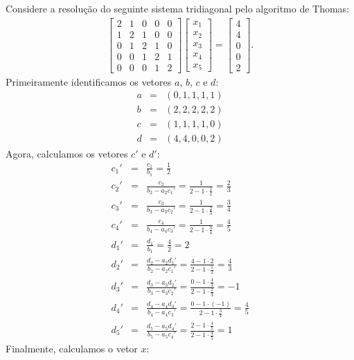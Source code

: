 \begin{ex}\label{linsis:exemplo5_5}
Considere a resolução do seguinte sistema tridiagonal pelo algoritmo de Thomas:
 \begin{eqnarray}\label{linsis:Exemplo5_5} \begin{bmatrix}
   { 2 } & { 1 } & { 0 } & { 0 } & { 0 } \\
   { 1 } & { 2 } & { 1 } & { 0 } & { 0 } \\
   { 0 } & { 1 } & { 2 } & { 1 } & { 0 } \\
   { 0 } & { 0 } & { 1 } & { 2 } & { 1 } \\
   { 0 } & { 0 } & { 0 } & { 1 } & { 2 }
 \end{bmatrix}
\begin{bmatrix}
   {x_1 }  \\
   {x_2 }  \\
   {x_3 }  \\
   {x_4 }  \\
   {x_5 }
\end{bmatrix}
=
\begin{bmatrix}
   {4}  \\
   {4 }  \\
   {0}  \\
   {0}\\
   {2 }
\end{bmatrix}
.
\end{eqnarray}
Primeiramente identificamos os vetores $a$, $b$, $c$ e $d$:
\begin{eqnarray}
 a &=& (0, 1, 1, 1, 1)\\
 b &=& (2, 2, 2, 2, 2)\\
 c &=& (1, 1, 1, 1, 0)\\
 d &=& (4, 4, 0, 0, 2)
\end{eqnarray}
Agora, calculamos os vetores $c'$ e $d'$:
\begin{eqnarray}
 c_1' &=&\frac{c_1}{b_1}=\frac{1}{2}\\
 c_2' &=&\frac{c_2}{b_2-a_2c_1'}=\frac{1}{2-1\cdot \frac{1}{2}}=\frac{2}{3} \\
 c_3' &=&\frac{c_3}{b_3-a_3c_2'}=\frac{1}{2-1\cdot \frac{2}{3}}=\frac{3}{4} \\
 c_4' &=&\frac{c_4}{b_4-a_4c_3'}=\frac{1}{2-1\cdot \frac{3}{4}}=\frac{4}{5} \\
 d_1' &=&\frac{d_1}{b_1}=\frac{4}{2}=2\\
 d_2' &=&\frac{d_2-a_2d_1'}{b_2-a_2c_1'}=\frac{4-1\cdot 2}{2-1\cdot \frac{1}{2}}=\frac{4}{3} \\
 d_3' &=&\frac{d_3-a_3d_2'}{b_3-a_3c_2'}=\frac{0-1\cdot \frac{4}{3}}{2-1\cdot \frac{2}{3}}=-1 \\
 d_4' &=&\frac{d_4-a_4d_3'}{b_4-a_4c_3'}=\frac{0-1\cdot (-1)}{2-1\cdot \frac{3}{4}}=\frac{4}{5} \\
 d_5' &=&\frac{d_5-a_5d_4'}{b_5-a_5c_4'}=\frac{2-1\cdot \frac{4}{5}}{2-1\cdot \frac{4}{5}}=1
\end{eqnarray}
 Finalmente, calculamos o vetor $x$:


\end{ex}
